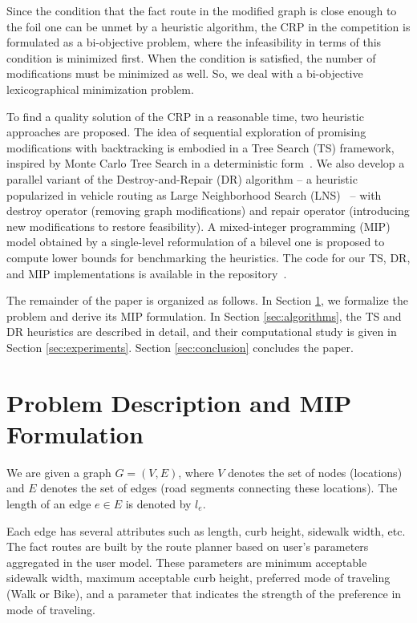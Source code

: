 \documentclass{article}
\begin{document}
Since the condition that the fact route in the modified graph is close enough to the foil one can be unmet by a heuristic algorithm, the CRP in the competition is formulated as a bi-objective problem, where the infeasibility in terms of this condition is minimized first.
When the condition is satisfied, the number of modifications must be minimized as well. 
So, we deal with a bi-objective lexicographical minimization problem. 

To find a quality solution of the CRP in a reasonable time, two heuristic approaches are proposed. 
The idea of sequential exploration of promising modifications with backtracking is embodied in a Tree Search (TS) framework, inspired by Monte Carlo Tree Search in a deterministic form~\cite{browne-et-al:survey-mcts}.
We also develop a parallel variant of the Destroy-and-Repair (DR) algorithm -- a heuristic popularized in vehicle routing as Large Neighborhood Search (LNS)~\cite{pisinger-ropke:lns} -- with destroy operator (removing graph modifications) and repair operator (introducing new modifications to restore feasibility).
A mixed-integer programming (MIP) model obtained by a single-level reformulation of a bilevel one is proposed to compute lower bounds for benchmarking the heuristics. The code for our TS, DR, and MIP implementations is available in the repository~\cite{codebase}.

The remainder of the paper is organized as follows.
In Section \ref{sec:problem}, we formalize the problem and derive its MIP formulation.
In Section \ref{sec:algorithms}, the TS and DR heuristics are described in detail, and their computational study is given in Section \ref{sec:experiments}.
Section \ref{sec:conclusion} concludes the paper.

\section{Problem Description and MIP Formulation}
\label{sec:problem}

We are given a graph $G = (V,E)$, where $V$ denotes the set of nodes (locations) and $E$ denotes the set of edges (road segments connecting these locations). 
The length of an edge $e\in E$ is denoted by $l_e$. 

Each edge has several attributes such as length, curb height, sidewalk width, etc. 
The fact routes are built by the route planner based on user's parameters aggregated in the user model. 
These parameters are minimum acceptable sidewalk width, maximum acceptable curb height, preferred mode of traveling (Walk or Bike), and a parameter that indicates the strength of the preference in mode of traveling.
\end{document}
